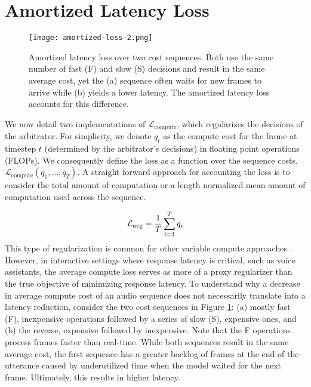 \documentclass[a4paper]{article}
\newcommand{\computecost}{q}
\begin{document}
\section{Amortized Latency Loss}
\label{sec:am_latency_loss}
\begin{figure}[t!]
	\vspace{-2.0mm}
	\texttt{[image: amortized-loss-2.png]}
	\vspace{-2.0mm}
	\caption{\small Amortized latency loss over two cost sequences. Both use the same number of fast (F) and slow (S) decisions and result in the same average cost, yet the (a) sequence often waits for new frames to arrive while (b) yields a lower latency. The amortized latency loss accounts for this difference.}
	\vspace{-4.0mm}
	\label{fig:amortized_loss}
\end{figure}

We now detail two implementations of $\mathcal{L}_{\text{compute}}$, which regularizes the decisions of the arbitrator.
For simplicity, we denote $\computecost_t$ as the compute cost for the frame at timestep $t$ (determined by the arbitrator's decisions) in floating point operations (FLOPs). We consequently define the loss as a function over the sequence costs, $\mathcal{L}_{\text{compute}} \left( \computecost_1, \dots, \computecost_T \right)$.
A straight forward approach for accounting the loss is to consider the total amount of computation or a length normalized mean amount of computation used across the sequence.

\noindent
\begin{align}
	\noindent
	\mathcal{L}_{\text{avg}} = \frac{1}{T} \sum_{i = 1}^T {\computecost_i}
\end{align}
\noindent
This type of regularization is common for other variable compute approaches \cite{Tyagi2020,Bengio2015b,Graves2016}.
However, in interactive settings where response latency is critical, such as voice assistants, the average compute loss serves as more of a proxy regularizer than the true objective of minimizing response latency.
To understand why a decrease in average compute cost of an audio sequence does not necessarily translate into a latency reduction, consider the two cost sequences in Figure \ref{fig:amortized_loss}: (a) mostly fast (F), inexpensive operations followed by a series of slow (S), expensive ones, and (b) the reverse, expensive followed by inexpensive.
Note that the F operations process frames faster than real-time.
While both sequences result in the same average cost, the first sequence has a greater backlog of frames at the end of the utterance caused by underutilized time when the model waited for the next frame. Ultimately, this results in higher latency. 
\end{document}
